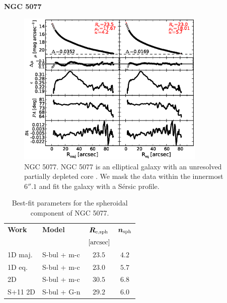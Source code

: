 \documentclass[preprint2]{emulateapj}
\newcommand{\fitfigurewidth}{0.8\textwidth}
\begin{document}
  \clearpage\newpage\noindent
  {\bf NGC 5077 \\}

  \begin{figure}[h]
  \begin{center}
  \includegraphics[width=\fitfigurewidth]{images/n5077_1Dfit.eps}
  \caption{NGC 5077. 
  NGC 5077 is an elliptical galaxy with an unresolved partially depleted core \citep{trujillo2004coresersicmodel}. 
  We mask the data within the innermost $6''.1$ and fit the galaxy with a S\'ersic profile. }
  \end{center}
  \end{figure}

  \begin{table}[h]
  \small
  \caption{Best-fit parameters for the spheroidal component of NGC 5077.}
  \begin{center}
  \begin{tabular}{llcc}
  \hline
  {\bf Work} & {\bf Model}   & $\bm R_{\rm e,sph}$    & $\bm n_{\rm sph}$ \\
    &  &  $[\rm arcsec]$ & \\
  \hline
  1D maj. & S-bul + m-c & $23.5$  &  $4.2$ \\
  1D eq.  & S-bul + m-c & $23.0$  &  $5.7$ \\
  2D      & S-bul + m-c & $30.5$  &  $6.8$ \\
  \hline
  S+11 2D         & S-bul + G-n & $29.2$  &  $6.0$ \\
  \hline
  \end{tabular}
  \end{center}
  \label{tab:n5077}
  \end{table}
\end{document}
